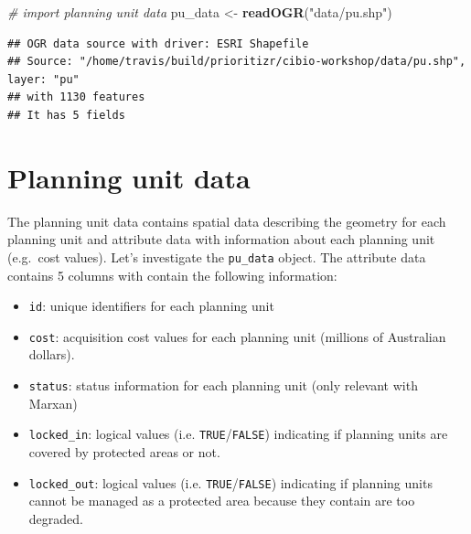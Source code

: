 \documentclass[12pt,]{book}
\newenvironment{Shaded}{\begin{snugshade}}{\end{snugshade}}
\newcommand{\KeywordTok}[1]{\textcolor[rgb]{0.13,0.29,0.53}{\textbf{#1}}}
\newcommand{\StringTok}[1]{\textcolor[rgb]{0.31,0.60,0.02}{#1}}
\newcommand{\CommentTok}[1]{\textcolor[rgb]{0.56,0.35,0.01}{\textit{#1}}}
\newcommand{\OperatorTok}[1]{\textcolor[rgb]{0.81,0.36,0.00}{\textbf{#1}}}
\newcommand{\NormalTok}[1]{#1}
\providecommand{\tightlist}{%
  \setlength{\itemsep}{0pt}\setlength{\parskip}{0pt}}
\begin{document}
\begin{Shaded}
\begin{Highlighting}[]
\CommentTok{# import planning unit data}
\NormalTok{pu_data <-}\StringTok{ }\KeywordTok{readOGR}\NormalTok{(}\StringTok{"data/pu.shp"}\NormalTok{)}
\end{Highlighting}
\end{Shaded}

\begin{verbatim}
## OGR data source with driver: ESRI Shapefile 
## Source: "/home/travis/build/prioritizr/cibio-workshop/data/pu.shp", layer: "pu"
## with 1130 features
## It has 5 fields
\end{verbatim}

\begin{Shaded}
\end{Shaded}

\clearpage

\section{Planning unit data}\label{planning-unit-data}

The planning unit data contains spatial data describing the geometry for
each planning unit and attribute data with information about each
planning unit (e.g.~cost values). Let's investigate the
\texttt{pu\_data} object. The attribute data contains 5 columns with
contain the following information:

\begin{itemize}
\tightlist
\item
  \texttt{id}: unique identifiers for each planning unit
\item
  \texttt{cost}: acquisition cost values for each planning unit
  (millions of Australian dollars).
\item
  \texttt{status}: status information for each planning unit (only
  relevant with Marxan)
\item
  \texttt{locked\_in}: logical values (i.e.
  \texttt{TRUE}/\texttt{FALSE}) indicating if planning units are covered
  by protected areas or not.
\item
  \texttt{locked\_out}: logical values (i.e.
  \texttt{TRUE}/\texttt{FALSE}) indicating if planning units cannot be
  managed as a protected area because they contain are too degraded.
\end{itemize}
\end{document}
